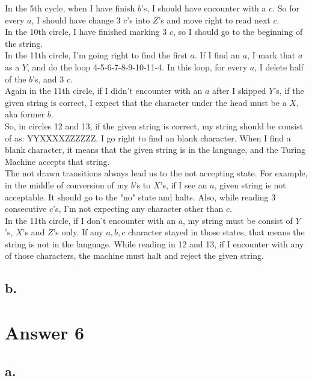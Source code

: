 \documentclass[12pt]{article}
\begin{document}
In the 5th cycle, when I have finish $b$'s, I should have encounter with a $c$. So for every $a$, I should have change 3 $c$'s into $Z$'s and move right to read next $c$.\\
In the 10th circle, I have finished marking 3 $c$, so I should go to the beginning of the string.\\
In the 11th circle, I'm going right to find the first $a$. If I find an $a$, I mark that $a$ as a $Y$, and do the loop 4-5-6-7-8-9-10-11-4. In this loop, for every $a$, I delete half of the $b$'s, and 3 $c$.\\
Again in the 11th circle, if I didn't encounter with an $a$ after I skipped $Y$'s, if the given string is correct, I expect that the character under the head must be a $X$, aka former $b$.\\
So, in circles 12 and 13, if the given string is correct, my string should be consist of as: YYXXXXZZZZZZ. I go right to find an blank character. When I find a blank character, it means that the given string is in the language, and the Turing Machine accepts that string.\\
The not drawn transitions always lead us to the not accepting state. For example, in the middle of conversion of my $b$'s to $X$'s, if I see an $a$, given string is not acceptable. It should go to the "no" state and halts. Also, while reading 3 consecutive $c$'s, I'm not expecting any character other than $c$.\\
In the 11th circle, if I don't encounter with an $a$, my string must be consist of $Y$'s, $X$'s and $Z$'s only. If any $a,b,c$ character  stayed in those states, that means the string is not in the language. While reading in 12 and 13, if I encounter with any of those characters, the machine must halt and reject the given string.\\ 

\subsection*{b.}



\section*{Answer 6}

\subsection*{a.}
\end{document}
